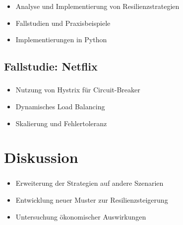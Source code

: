 \begin{frame}
    \frametitle{\insertsection}
    \framesubtitle{\insertsubsection}

    \begin{itemize}
        \item Analyse und Implementierung von Resilienzstrategien
        \item Fallstudien und Praxisbeispiele
        \item Implementierungen in Python
    \end{itemize}
\end{frame}

\subsection{Fallstudie: Netflix}
\begin{frame}
    \frametitle{\insertsection}
    \framesubtitle{\insertsubsection}

    \begin{itemize}
        \item Nutzung von Hystrix für Circuit-Breaker
        \item Dynamisches Load Balancing
        \item Skalierung und Fehlertoleranz
    \end{itemize}
\end{frame}

%
%

\section{Diskussion}

\begin{frame}
    \frametitle{\insertsection}
    \framesubtitle{\insertsubsection}

    \begin{itemize}
        \item Erweiterung der Strategien auf andere Szenarien
        \item Entwicklung neuer Muster zur Resilienzsteigerung
        \item Untersuchung ökonomischer Auswirkungen
    \end{itemize}
\end{frame}

